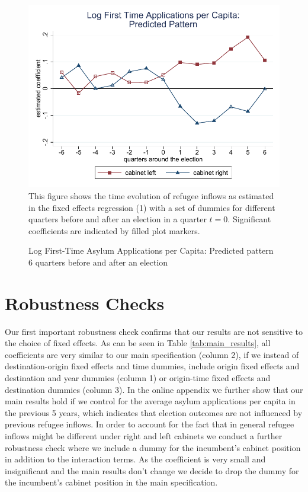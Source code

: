 \documentclass[a4paper,12pt]{article}
\begin{document}
\begin{figure}
	\centering
    \caption{Log First-Time Asylum Applications per Capita: Predicted pattern 6 quarters before and after an election}
	\includegraphics[width=1\textwidth]{app_Graph2.pdf}
	      {\footnotesize This figure shows the time evolution of refugee inflows as estimated in the fixed effects regression (1) with a set of dummies for different quarters before and after an election in a quarter $t=0$. Significant coefficients are indicated by filled plot markers. }\\
\label{main_results_quarters}
\end{figure}

\section{Robustness Checks}\label{sec:robustness}
Our first important robustness check confirms that our results are not sensitive to the choice of fixed effects. As can be seen in Table \ref{tab:main_results}, all coefficients are very similar to our main specification (column 2), if we instead of destination-origin fixed effects and time dummies, include origin fixed effects and destination and year dummies (column 1)  or origin-time fixed effects and destination dummies (column 3).  In the online appendix we further show that our main results hold if we control for the average asylum applications per capita in the previous 5 years, which indicates that election outcomes are not influenced by previous refugee inflows.  In order to account for the fact that in general refugee inflows might be different under right and left cabinets we conduct a further robustness check where we include a dummy for the incumbent's cabinet position  in addition to the interaction terms.  As the coefficient is very small and insignificant and the main results don't change we decide to drop the dummy for the incumbent's cabinet position in the main specification.  
\end{document}

